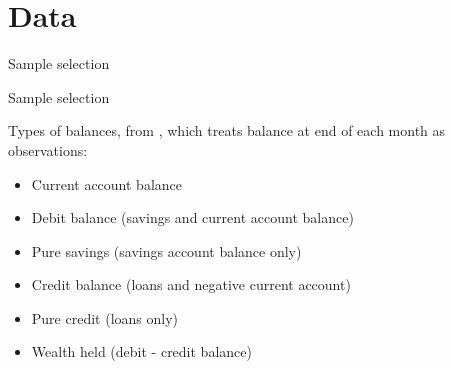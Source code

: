 
\section{Data}%
\label{sec:data}

\begin{table}[ht]
\caption{Sample selection}\label{tab:selection}

\end{table}


\begin{table}[ht]
\caption{Sample selection}\label{tab:selection}

\end{table}


Types of balances, from \citet{becker2017does}, which treats balance at end of
each month as observations:

\begin{itemize}
    \item Current account balance
    \item Debit balance (savings and current account balance)
    \item Pure savings (savings account balance only)
    \item Credit balance (loans and negative current account)
    \item Pure credit (loans only)
    \item Wealth held (debit - credit balance)
\end{itemize}
